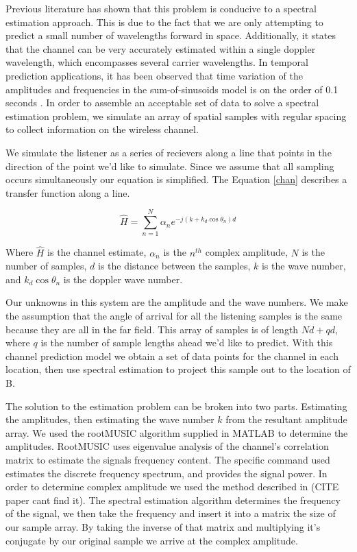 \documentclass{allertonproc}
\begin{document}
Previous literature \cite{duel-hallen2007} has shown that this problem is conducive to a spectral estimation approach. This is due to the fact that we are only attempting to predict a small number of wavelengths forward in space. Additionally, it states that the channel can be very accurately estimated within a single doppler wavelength, which encompasses several carrier wavelengths. In temporal prediction applications, it has been observed that time variation of the amplitudes and frequencies in the sum-of-sinusoids model is on the order of 0.1 seconds \cite{duel-hallen2007}. In order to assemble an acceptable set of data to solve a spectral estimation problem, we simulate an array of spatial samples with regular spacing to collect information on the wireless channel.

We simulate the listener as a series of recievers along a line that points in the direction of the point we'd like to simulate. Since we assume that all sampling occurs simultaneously our equation is simplified. The Equation \ref{chan} describes a transfer function along a line.


\begin{equation}\label{chan}
\hat{H}= \sum_{n=1}^N \alpha_n e^{-j(k+k_d\cos\theta_n)d}
\end{equation}

 Where $\hat{H}$ is the channel estimate, $\alpha_n$ is the $n^{th}$ complex amplitude, $N$ is the number of samples, $d$ is the distance between the samples, $k$ is the wave number, and $k_d\cos\theta_n$ is the doppler wave number. 

Our unknowns in this system are the amplitude and the wave numbers. We make the assumption that the angle of arrival for all the listening samples is the same because they are all in the far field. This array of samples is of length $Nd+qd$, where $q$ is the number of sample lengths ahead we'd like to predict. With this channel prediction model we obtain a set of data points for the channel in each location, then use spectral estimation to project this sample out to the location of B.

The solution to the estimation problem can be broken into two parts. Estimating the amplitudes, then estimating the wave number $k$ from the resultant amplitude array. We used the rootMUSIC algorithm supplied in MATLAB to determine the amplitudes. RootMUSIC uses eigenvalue analysis of the channel's correlation matrix to estimate the signals frequency content. The specific command used estimates the discrete frequency spectrum, and provides the signal power.  In order to determine complex amplitude we used the method described in (CITE paper cant find it). The spectral estimation algorithm determines the frequency of the signal, we then take the frequency and insert it into a matrix the size of our sample array. By taking the inverse of that matrix and multiplying it's conjugate by our original sample we arrive at the complex amplitude. %
\end{document}
